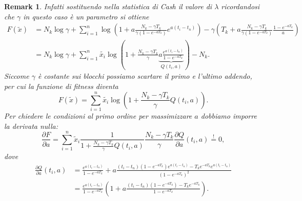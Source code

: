 \documentclass[10pt,a4paper]{report}
\newtheorem{remark}{Remark}
\begin{document}
\begin{remark}
Infatti sostituendo nella statistica di Cash il valore di $\lambda$ ricordandosi che $\gamma$ in questo caso è un parametro si ottiene
\begin{align*}
F(\tilde{x}) &= N_k\log\gamma+\sum_{i=1}^n\log\left(1+a\frac{N_k-\gamma T_k}{\gamma(1-e^{-aT_k})}e^{a(t_i-t_n)}\right)-\gamma\left(T_k+ a\frac{N_k-\gamma T_k}{\gamma(1-e^{-aT_k})} \frac{1-e^{-aT_k}}{a}\right)\\
&= N_k\log\gamma+\sum_{i=1}^n\tilde{x_i}\log\left(1+\frac{N_k-\gamma T_k}{\gamma}\underbrace{a\frac{e^{a(t_i-t_n)}}{1-e^{-aT_k}}}_{Q(t_i,a)}\right)-N_k.
\end{align*}
Siccome $\gamma$ è costante sui blocchi possiamo scartare il primo e l'ultimo addendo, per cui la funzione di fitness diventa
$$
F(\tilde{x}) = \sum_{i=1}^n\tilde{x_i}\log\left(1+\frac{N_k-\gamma T_k}{\gamma}Q(t_i,a)\right).
$$
Per chiedere le condizioni al primo ordine per massimizzare $a$ dobbiamo imporre la derivata nulla:
$$
\frac{\partial F}{\partial a} = \sum_{i=1}^n\tilde{x}_i\frac{1}{1+\frac{N_k-\gamma T_k}{\gamma}Q(t_i,a)}\frac{N_k-\gamma T_k}{\gamma}\frac{\partial Q}{\partial a}(t_i,a)\stackrel{!}{=}0,
$$
dove
\begin{align*}
\frac{\partial Q}{\partial a}(t_i,a) &= \frac{e^{a(t_i-t_n)}}{1-e^{-aT_k}} + a\frac{(t_i-t_n)(1-e^{-aT_k})e^{a(t_i-t_n)}-T_ke^{-aT_k}e^{a(t_i-t_n)}}{(1-e^{-aT_k})^2}\\
&= \frac{e^{a(t_i-t_n)}}{1-e^{-aT_k}}\left(1+a\frac{(t_i-t_n)(1-e^{-aT_k})-T_ke^{-aT_k}}{1-e^{-aT_k}}\right).
\end{align*}
\end{remark}
\end{document}
